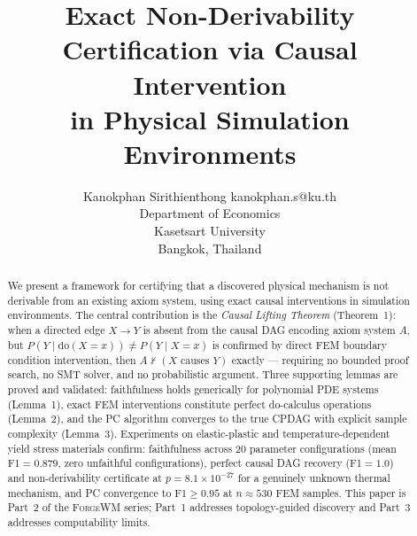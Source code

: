 \documentclass[twoside,11pt]{article}
\newcommand{\doOp}{\mathrm{do}}
\newcommand{\ForgeWM}{\textsc{ForgeWM}\xspace}
\begin{document}
\title{Exact Non-Derivability Certification via Causal Intervention\\
  in Physical Simulation Environments}

\author{%
  \name Kanokphan Sirithienthong \email kanokphan.s@ku.th\\
  \addr Department of Economics\\
  Kasetsart University\\
  Bangkok, Thailand
}

\maketitle
{}


\begin{abstract}
We present a framework for certifying that a discovered physical
mechanism is not derivable from an existing axiom system, using exact
causal interventions in simulation environments. The central
contribution is the \emph{Causal Lifting Theorem} (Theorem~1): when a
directed edge $X \to Y$ is absent from the causal DAG encoding axiom
system $A$, but $P(Y \mid \doOp(X{=}x)) \neq P(Y \mid X{=}x)$ is
confirmed by direct FEM boundary condition intervention, then
$A \nvdash (X \text{ causes } Y)$ exactly --- requiring no bounded
proof search, no SMT solver, and no probabilistic argument. Three
supporting lemmas are proved and validated: faithfulness holds
generically for polynomial PDE systems (Lemma~1), exact FEM
interventions constitute perfect do-calculus operations (Lemma~2), and
the PC algorithm converges to the true CPDAG with explicit sample
complexity (Lemma~3). Experiments on elastic-plastic and
temperature-dependent yield stress materials confirm: faithfulness
across 20 parameter configurations (mean F1$=0.879$, zero unfaithful
configurations), perfect causal DAG recovery (F1$=1.0$) and
non-derivability certificate at $p = 8.1 \times 10^{-27}$ for a
genuinely unknown thermal mechanism, and PC convergence to F1$\geq
0.95$ at $n \approx 530$ FEM samples. This paper is Part~2 of the
\ForgeWM series; Part~1 addresses topology-guided discovery and
Part~3 addresses computability limits.
\end{abstract}

\end{document}
